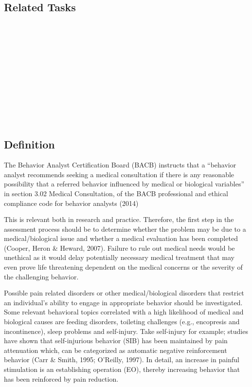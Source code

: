 \subsection{Related Tasks}
\fourgOne{}\\
\fourgTwo{}\\
\fourgThree{}\\
\fourgFour{}\\
\fourgFive{}\\
\fourgSix{}\\
\fourgSeven{}\\
\fouriThree{}\\
\fouriFour{}\\
\fourkOne{}\\
%
%
%
%
%
%
%
%
\section[\fourgTwo{}]{\fourgTwo{}%
              }
\subsection{Definition}
The Behavior Analyst Certification Board (BACB) instructs that a ``behavior analyst recommends seeking a medical consultation if there is any reasonable possibility that a referred behavior influenced by medical or biological variables'' in section 3.02 Medical Consultation, of the BACB professional and ethical compliance code for behavior analysts (2014)

This is relevant both in research and practice. Therefore, the first step in the assessment process should be to determine whether the problem may be due to a medical/biological issue and whether a medical evaluation has been completed (Cooper, Heron \& Heward, 2007). Failure to rule out medical needs would be unethical as it would delay potentially necessary medical treatment that may even prove life threatening dependent on the medical concerns or the severity of the challenging behavior.

Possible pain related disorders or other medical/biological disorders that restrict an individual's ability to engage in appropriate behavior should be investigated.  Some relevant behavioral topics correlated with a high likelihood of medical and biological causes are feeding disorders, toileting challenges (e.g., encopresis and incontinence), sleep problems and self-injury. Take self-injury for example; studies have shown that self-injurious behavior (SIB) has been maintained by pain attenuation which, can be categorized as automatic negative reinforcement behavior (Carr \& Smith, 1995; O'Reilly, 1997).  In detail, an increase in painful stimulation is an establishing operation (EO), thereby increasing behavior that has been reinforced by pain reduction.

